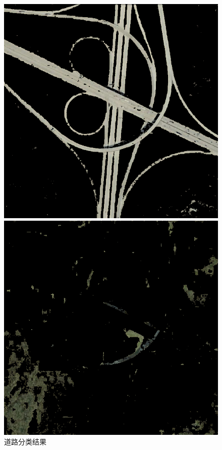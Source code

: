 \begin{figure}[H]
	\centering
	\begin{minipage}{0.3\linewidth}
		\includegraphics[width=\linewidth]{figure/viaduct_52_Road_Separated_P.png}
		\caption{道路分类结果}
		\label{fig:viaduct_52_road_separated}
	\end{minipage}
	\begin{minipage}{0.3\linewidth}
		\includegraphics[width=\linewidth]{figure/viaduct_52_Grass_Separated_P.png}

\end{minipage}
\end{figure}
